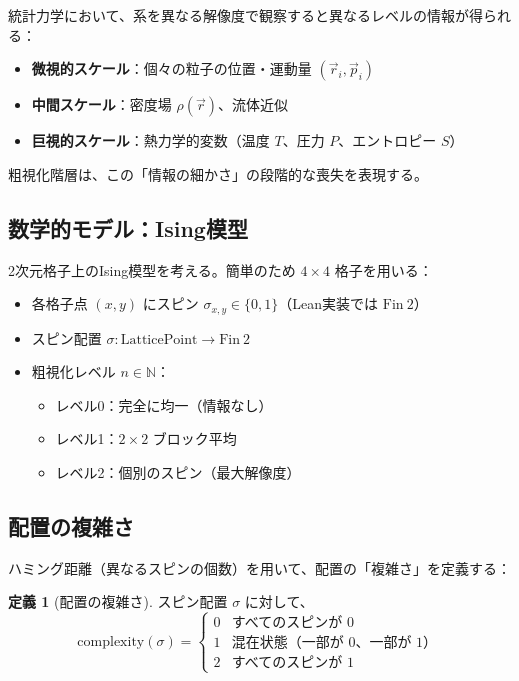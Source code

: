 \documentclass[a4paper,12pt]{ltjsarticle}
\theoremstyle{definition}
\newtheorem{definition}[theorem]{定義}
\newcommand{\N}{\mathbb{N}}
\begin{document}
統計力学において、系を異なる解像度で観察すると異なるレベルの情報が得られる：
\begin{itemize}
  \item \textbf{微視的スケール}：個々の粒子の位置・運動量 $(\vec{r}_i, \vec{p}_i)$
  \item \textbf{中間スケール}：密度場 $\rho(\vec{r})$、流体近似
  \item \textbf{巨視的スケール}：熱力学的変数（温度 $T$、圧力 $P$、エントロピー $S$）
\end{itemize}

粗視化階層は、この「情報の細かさ」の段階的な喪失を表現する。

\subsection{数学的モデル：Ising模型}

2次元格子上のIsing模型を考える。簡単のため $4 \times 4$ 格子を用いる：
\begin{itemize}
  \item 各格子点 $(x,y)$ にスピン $\sigma_{x,y} \in \{0, 1\}$（Lean実装では $\mathrm{Fin}\ 2$）
  \item スピン配置 $\sigma : \mathrm{LatticePoint} \to \mathrm{Fin}\ 2$
  \item 粗視化レベル $n \in \N$：
  \begin{itemize}
    \item レベル0：完全に均一（情報なし）
    \item レベル1：$2 \times 2$ ブロック平均
    \item レベル2：個別のスピン（最大解像度）
  \end{itemize}
\end{itemize}

\subsection{配置の複雑さ}

ハミング距離（異なるスピンの個数）を用いて、配置の「複雑さ」を定義する：

\begin{definition}[配置の複雑さ]
スピン配置 $\sigma$ に対して、
\[
\mathrm{complexity}(\sigma) =
\begin{cases}
0 & \text{すべてのスピンが } 0 \\
1 & \text{混在状態（一部が } 0\text{、一部が } 1\text{）} \\
2 & \text{すべてのスピンが } 1
\end{cases}
\]
\end{definition}
\end{document}
